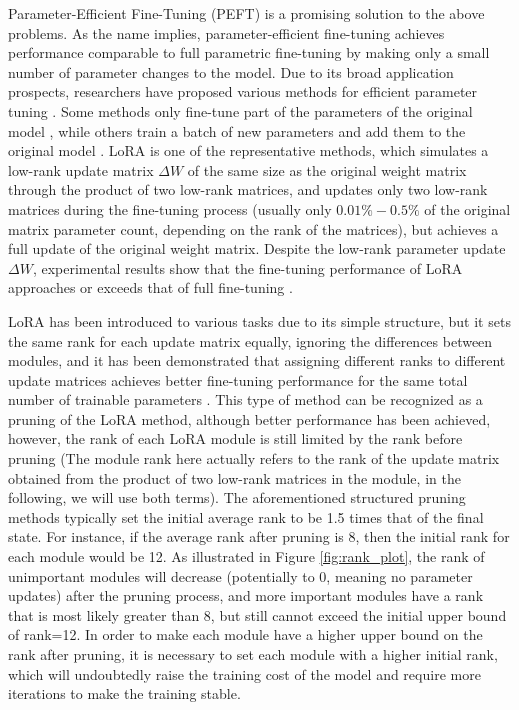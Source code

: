 Parameter-Efficient Fine-Tuning (PEFT) is a promising solution to the above problems. As the name implies, parameter-efficient fine-tuning achieves performance comparable to full parametric fine-tuning by making only a small number of parameter changes to the model. Due to its broad application prospects, researchers have proposed various methods for efficient parameter tuning \cite{peft:adapter,peft:prompt,peft:prefix,peft:bitfit,peft:lora}. Some methods only fine-tune part of the parameters of the original model \cite{peft:diffpurning,peft:bitfit}, while others train a batch of new parameters and add them to the original model \cite{peft:adapter,peft:PAdapter,peft:lst}. LoRA \cite{peft:lora} is one of the representative methods, which simulates a low-rank update matrix $\Delta W$ of the same size as the original weight matrix through the product of two low-rank matrices, and updates only two low-rank matrices during the fine-tuning process (usually only $0.01\%-0.5\%$ of the original matrix parameter count, depending on the rank of the matrices), but achieves a full update of the original weight matrix. Despite the low-rank parameter update $\Delta W$, experimental results show that the fine-tuning performance of LoRA approaches or exceeds that of full fine-tuning \cite{peft:lora}. 

LoRA has been introduced to various tasks \cite{c:1,c:2,c:3} due to its simple structure, but it sets the same rank for each update matrix equally, ignoring the differences between modules, and it has been demonstrated that assigning different ranks to different update matrices achieves better fine-tuning performance for the same total number of trainable parameters \cite{peft:adalora, c:2}. This type of method can be recognized as a pruning of the LoRA method, although better performance has been achieved, however, the rank of each LoRA module is still limited by the rank before pruning (The module rank here actually refers to the rank of the update matrix obtained from the product of two low-rank matrices in the module, in the following, we will use both terms). The aforementioned structured pruning methods typically set the initial average rank to be 1.5 times that of the final state. For instance, if the average rank after pruning is 8, then the initial rank for each module would be 12. As illustrated in Figure \ref{fig:rank_plot}, the rank of unimportant modules will decrease (potentially to 0, meaning no parameter updates) after the pruning process, and more important modules have a rank that is most likely greater than 8, but still cannot exceed the initial upper bound of rank=12. In order to make each module have a higher upper bound on the rank after pruning, it is necessary to set each module with a higher initial rank, which will undoubtedly raise the training cost of the model and require more iterations to make the training stable. 

